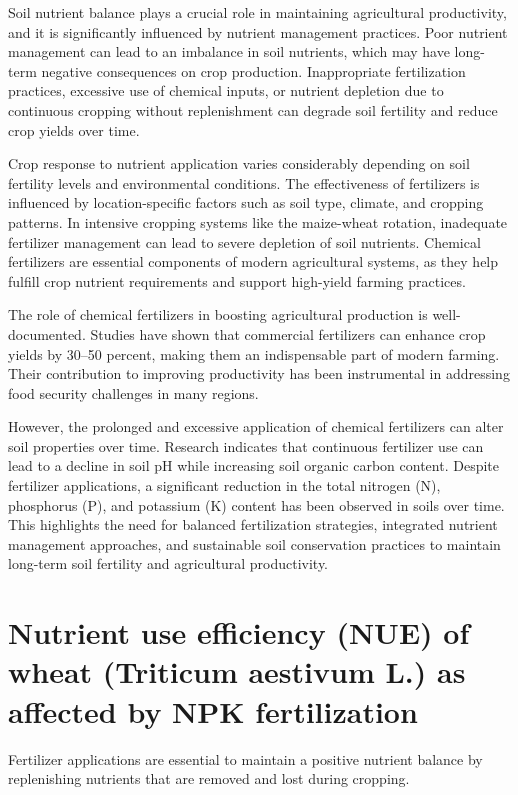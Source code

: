 \documentclass[a4paper,12pt]{article}
\begin{document}
Soil nutrient balance plays a crucial role in maintaining agricultural productivity, and it is significantly influenced by nutrient management practices. Poor nutrient management can lead to an imbalance in soil nutrients, which may have long-term negative consequences on crop production. Inappropriate fertilization practices, excessive use of chemical inputs, or nutrient depletion due to continuous cropping without replenishment can degrade soil fertility and reduce crop yields over time.

Crop response to nutrient application varies considerably depending on soil fertility levels and environmental conditions. The effectiveness of fertilizers is influenced by location-specific factors such as soil type, climate, and cropping patterns. In intensive cropping systems like the maize-wheat rotation, inadequate fertilizer management can lead to severe depletion of soil nutrients. Chemical fertilizers are essential components of modern agricultural systems, as they help fulfill crop nutrient requirements and support high-yield farming practices.

The role of chemical fertilizers in boosting agricultural production is well-documented. Studies have shown that commercial fertilizers can enhance crop yields by 30–50 percent, making them an indispensable part of modern farming. Their contribution to improving productivity has been instrumental in addressing food security challenges in many regions.

However, the prolonged and excessive application of chemical fertilizers can alter soil properties over time. Research indicates that continuous fertilizer use can lead to a decline in soil pH while increasing soil organic carbon content. Despite fertilizer applications, a significant reduction in the total nitrogen (N), phosphorus (P), and potassium (K) content has been observed in soils over time. This highlights the need for balanced fertilization strategies, integrated nutrient management approaches, and sustainable soil conservation practices to maintain long-term soil fertility and agricultural productivity.

\section{Nutrient use efficiency (NUE) of wheat  (Triticum aestivum L.) as affected by NPK  fertilization}
\parencite{@rawalNutrientUseEfficiency2022}
Fertilizer applications are essential to maintain a positive nutrient balance by replenishing nutrients that are removed and lost during cropping.
\end{document}
